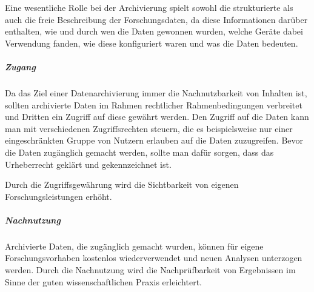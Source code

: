 Eine wesentliche Rolle bei der Archivierung spielt sowohl die strukturierte als auch die freie Beschreibung der Forschungsdaten, da diese Informationen darüber enthalten, wie und durch wen die Daten gewonnen wurden, welche Geräte dabei Verwendung fanden, wie diese konfiguriert waren und was die Daten bedeuten. 

\subparagraph{Zugang} Da das Ziel einer Datenarchivierung immer die Nachnutzbarkeit von Inhalten ist, sollten archivierte Daten im Rahmen rechtlicher Rahmenbedingungen verbreitet und Dritten ein Zugriff auf diese gewährt werden. Den Zugriff auf die Daten kann man mit verschiedenen Zugriffsrechten steuern, die es beispielsweise nur einer eingeschränkten Gruppe von Nutzern erlauben auf die Daten zuzugreifen. Bevor die Daten zugänglich gemacht werden, sollte man dafür sorgen, dass das Urheberrecht geklärt und gekennzeichnet ist.

Durch die Zugriffsgewährung wird die Sichtbarkeit von eigenen Forschungsleistungen erhöht.

\subparagraph{Nachnutzung} Archivierte Daten, die zugänglich gemacht wurden, können für eigene Forschungsvorhaben kostenlos wiederverwendet und neuen Analysen unterzogen werden. Durch die Nachnutzung wird die Nachprüfbarkeit von Ergebnissen im Sinne der guten wissenschaftlichen Praxis erleichtert.